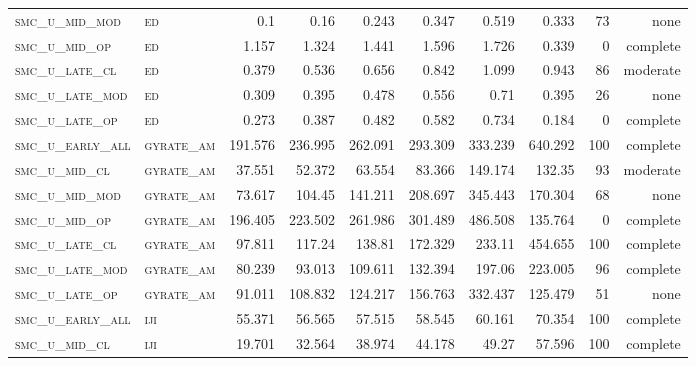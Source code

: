 \begin{landscape}
\begin{center}
\begin{footnotesize}
\begin{longtable}{llrrrrr|rrr}
\textsc{smc\_u\_mid\_mod  } & \textsc{ed        }   & 0.1      & 0.16     & 0.243    & 0.347    & 0.519    & 0.333         & 73            & none        \\
\textsc{smc\_u\_mid\_op   } & \textsc{ed        }   & 1.157    & 1.324    & 1.441    & 1.596    & 1.726    & 0.339         & 0             & complete            \\
\textsc{smc\_u\_late\_cl  } & \textsc{ed        }   & 0.379    & 0.536    & 0.656    & 0.842    & 1.099    & 0.943         & 86            & moderate        \\
\textsc{smc\_u\_late\_mod } & \textsc{ed        }   & 0.309    & 0.395    & 0.478    & 0.556    & 0.71     & 0.395         & 26            & none        \\
\textsc{smc\_u\_late\_op  } & \textsc{ed        }   & 0.273    & 0.387    & 0.482    & 0.582    & 0.734    & 0.184         & 0             & complete            \\
\textsc{smc\_u\_early\_all} & \textsc{gyrate\_am}   & 191.576  & 236.995  & 262.091  & 293.309  & 333.239  & 640.292       & 100           & complete        \\
\textsc{smc\_u\_mid\_cl   } & \textsc{gyrate\_am}   & 37.551   & 52.372   & 63.554   & 83.366   & 149.174  & 132.35        & 93            & moderate        \\
\textsc{smc\_u\_mid\_mod  } & \textsc{gyrate\_am}   & 73.617   & 104.45   & 141.211  & 208.697  & 345.443  & 170.304       & 68            & none        \\
\textsc{smc\_u\_mid\_op   } & \textsc{gyrate\_am}   & 196.405  & 223.502  & 261.986  & 301.489  & 486.508  & 135.764       & 0             & complete            \\
\textsc{smc\_u\_late\_cl  } & \textsc{gyrate\_am}   & 97.811   & 117.24   & 138.81   & 172.329  & 233.11   & 454.655       & 100           & complete        \\
\textsc{smc\_u\_late\_mod } & \textsc{gyrate\_am}   & 80.239   & 93.013   & 109.611  & 132.394  & 197.06   & 223.005       & 96            & complete        \\
\textsc{smc\_u\_late\_op  } & \textsc{gyrate\_am}   & 91.011   & 108.832  & 124.217  & 156.763  & 332.437  & 125.479       & 51            & none        \\
\textsc{smc\_u\_early\_all} & \textsc{iji       }   & 55.371   & 56.565   & 57.515   & 58.545   & 60.161   & 70.354        & 100           & complete        \\
\textsc{smc\_u\_mid\_cl   } & \textsc{iji       }   & 19.701   & 32.564   & 38.974   & 44.178   & 49.27    & 57.596        & 100           & complete        \\

\end{longtable}
\end{footnotesize}
\end{center}
\end{landscape}
